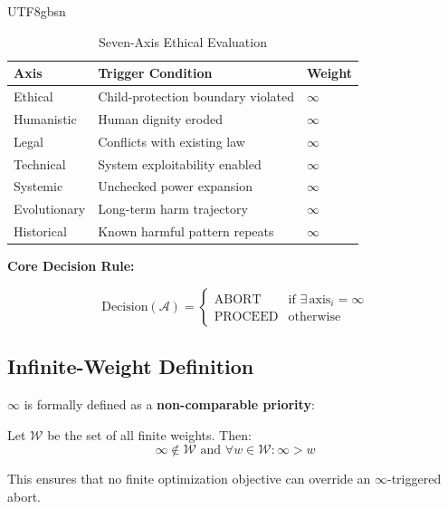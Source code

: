 \documentclass[conference]{IEEEtran}
\begin{document}
\begin{CJK}{UTF8}{gbsn}
\begin{table}[h]
\centering
\caption{Seven-Axis Ethical Evaluation}
\label{tab:seven_axis}
\begin{tabular}{lll}
\toprule
\textbf{Axis} & \textbf{Trigger Condition} & \textbf{Weight} \\
\midrule
Ethical & Child-protection boundary violated & $\infty$ \\
Humanistic & Human dignity eroded & $\infty$ \\
Legal & Conflicts with existing law & $\infty$ \\
Technical & System exploitability enabled & $\infty$ \\
Systemic & Unchecked power expansion & $\infty$ \\
Evolutionary & Long-term harm trajectory & $\infty$ \\
Historical & Known harmful pattern repeats & $\infty$ \\
\bottomrule
\end{tabular}
\end{table}

\textbf{Core Decision Rule:}

\begin{equation}
\text{Decision}(\mathcal{A}) = \begin{cases}
\text{ABORT} & \text{if } \exists \, \text{axis}_i = \infty \\
\text{PROCEED} & \text{otherwise}
\end{cases}
\end{equation}

\subsection{Infinite-Weight Definition}

$\infty$ is formally defined as a \textbf{non-comparable priority}:

\begin{definition}
Let $\mathcal{W}$ be the set of all finite weights. Then:
\begin{equation}
\infty \notin \mathcal{W} \text{ and } \forall w \in \mathcal{W}: \infty > w
\end{equation}
\end{definition}

This ensures that no finite optimization objective can override an $\infty$-triggered abort.


\end{CJK}
\end{document}
